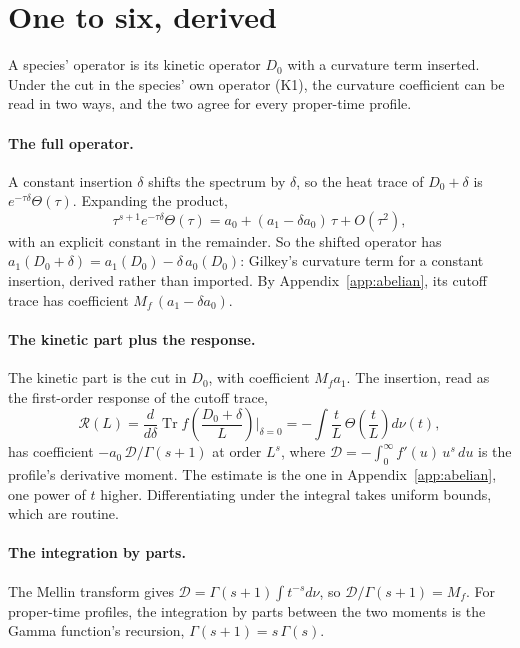 \documentclass[aps,prd,reprint,amsmath,amssymb,superscriptaddress,nofootinbib]{revtex4-2}
\begin{document}
\section{One to six, derived}
\label{app:onetosix}

A species' operator is its kinetic operator $D_0$ with a curvature term inserted. Under
the cut in the species' own operator (K1), the curvature coefficient can be read in two
ways, and the two agree for every proper-time profile.

\paragraph{The full operator.}
A constant insertion $\delta$ shifts the spectrum by $\delta$, so the heat trace of
$D_0+\delta$ is $e^{-\tau\delta}\Theta(\tau)$. Expanding the product,
\begin{equation}
  \tau^{s+1}e^{-\tau\delta}\Theta(\tau)=a_0+(a_1-\delta a_0)\,\tau+O(\tau^2),
\end{equation}
with an explicit constant in the remainder. So the shifted operator has
$a_1(D_0+\delta)=a_1(D_0)-\delta\,a_0(D_0)$: Gilkey's curvature term for a constant
insertion, derived rather than imported. By Appendix~\ref{app:abelian}, its cutoff trace
has coefficient $M_f\,(a_1-\delta a_0)$.

\paragraph{The kinetic part plus the response.}
The kinetic part is the cut in $D_0$, with coefficient $M_f a_1$. The insertion, read as the
first-order response of the cutoff trace,
\begin{equation}
  \mathcal R(L)=\frac{d}{d\delta}\operatorname{Tr}f\!\left(\frac{D_0+\delta}{L}\right)\Big|_{\delta=0}
  =-\int\frac{t}{L}\,\Theta\!\left(\frac tL\right)d\nu(t),
\end{equation}
has coefficient $-a_0\,\mathcal D/\Gamma(s+1)$ at order $L^s$, where
$\mathcal D=-\int_0^\infty f'(u)\,u^s\,du$ is the profile's derivative moment. The estimate
is the one in Appendix~\ref{app:abelian}, one power of $t$ higher. Differentiating under
the integral takes uniform bounds, which are routine.

\paragraph{The integration by parts.}
The Mellin transform gives $\mathcal D=\Gamma(s+1)\int t^{-s}d\nu$, so
$\mathcal D/\Gamma(s+1)=M_f$. For proper-time profiles, the integration by parts between the
two moments is the Gamma function's recursion, $\Gamma(s+1)=s\,\Gamma(s)$.
\end{document}
